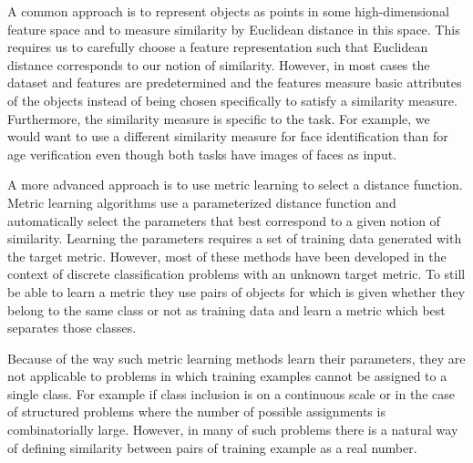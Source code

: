 A common approach %
 is to represent objects as points in some high-dimensional feature space and to measure similarity by Euclidean distance in this space. This requires us to carefully choose a feature representation such that Euclidean distance corresponds to our notion of similarity.  However, in most cases the dataset and features are predetermined and the features  measure  basic attributes of the objects instead of being chosen specifically to satisfy a similarity measure. Furthermore, the similarity measure is specific to the task. For example, we would want to use a different similarity measure for face identification than for age verification even though both tasks have images of faces as input.

A more advanced approach is to use metric learning to select a distance function. Metric learning algorithms use a parameterized distance function and automatically select the parameters that best correspond to a given notion of similarity. Learning the parameters requires a set of training data generated with the target metric.  However, most of these methods have been developed in the context of discrete classification problems with an unknown target metric. To still be able to learn a metric they use pairs of objects for which is given whether they belong to the same class or not as training data and learn a metric which best separates those classes. 

Because of the way such metric learning methods learn their parameters, they are not applicable to problems in which training examples cannot be assigned to a single class. For example if class inclusion is on a continuous scale or in the case of structured problems where the number of possible assignments is combinatorially large. However, in many of such problems there is a natural way of defining similarity between pairs of training example as a real number. 

